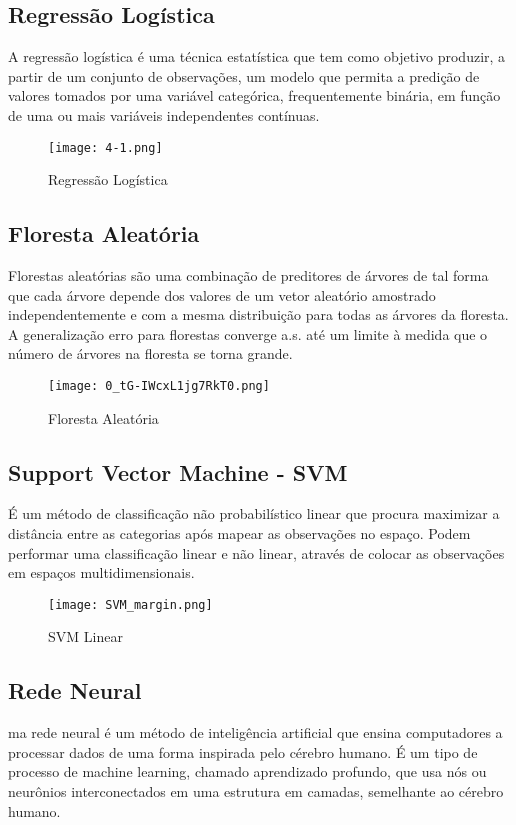 \subsection{Regressão Logística}
A regressão logística é uma técnica estatística que tem como objetivo produzir, a partir de um conjunto de observações, um modelo que permita a predição de valores tomados por uma variável categórica, 
frequentemente binária, em função de uma ou mais variáveis independentes contínuas.

\begin{figure}[!h]
    \centering
    \texttt{[image: 4-1.png]}
    \caption{Regressão Logística}
\end{figure}

\subsection{Floresta Aleatória}
Florestas aleatórias são uma combinação de preditores de árvores de tal forma que cada árvore depende dos valores de um
vetor aleatório amostrado independentemente e com a mesma distribuição para todas as árvores da floresta. A generalização
erro para florestas converge a.s. até um limite à medida que o número de árvores na floresta se torna grande. 

\begin{figure}[!h]
    \centering
    \texttt{[image: 0\_tG-IWcxL1jg7RkT0.png]}
    \caption{Floresta Aleatória}
\end{figure}

\subsection{Support Vector Machine - SVM}
É um método de classificação não probabilístico linear que
procura maximizar a distância entre as categorias após mapear 
as observações no espaço. Podem performar uma classificação linear e não 
linear, através de colocar as observações em espaços multidimensionais. 

\begin{figure}[!h]
    \centering
    \texttt{[image: SVM\_margin.png]}
    \caption{SVM Linear}
\end{figure}

\clearpage


\subsection{Rede Neural}
ma rede neural é um método de inteligência artificial que ensina 
computadores a processar dados de uma forma inspirada pelo cérebro humano. 
É um tipo de processo de machine learning, chamado aprendizado profundo, 
que usa nós ou neurônios interconectados em uma estrutura em camadas, semelhante ao cérebro humano.

